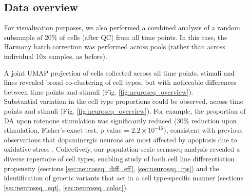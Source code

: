 



\newpage

\subsection{Data overview}

For visualisation purposes, we also performed a combined analysis of a random subsample of 20\% of cells (after QC) from all time points.
In this case, the Harmony batch correction was performed across pools (rather than across individual 10x samples, as before).

A joint UMAP projection of cells collected across all time points, stimuli and lines revealed broad co-clustering of cell types, but with noticeable differences between time points and stimuli (Fig. \ref{fig:neuroseq_overview}). \\

Substantial variation in the cell type proportions could be observed, across time points and stimuli (Fig. \ref{fig:neuroseq_overview}). 
For example, the proportion of DA upon rotenone stimulation was significantly reduced (30\% reduction upon stimulation, Fisher’s exact test, p value = $2.2 \times 10^{-16}$), consistent with previous observations that dopaminergic neurons are most affected by apoptosis due to oxidative stress \cite{sherer2003mechanism, knonagel1992autologous, cannon2009highly}.
Collectively, our population-scale \gls{scrnaseq} analysis revealed a diverse repertoire of cell types, enabling study of both cell line differentiation propensity (sections \ref{sec:neuroseq_diff_eff}, \ref{sec:neuroseq_ips}) and the identification of genetic variants that act in a cell type-specific manner (sections \ref{sec:neuroseq_eqt}, \ref{sec:neuroseq_coloc}). 
\\ 

